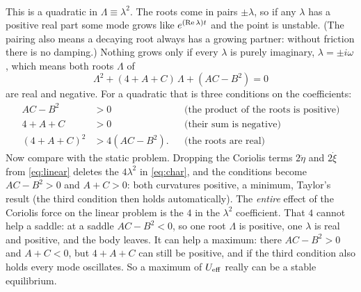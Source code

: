 \documentclass[12pt]{article}
\numberwithin{equation}{section}
\newcommand{\Ueff}{U_{\rm eff}}
\begin{document}
\begin{tcolorbox}[enhanced,breakable,colback=gray!8,colframe=gray!45,boxrule=0.5pt,
    left=5pt,right=5pt,top=5pt,bottom=5pt]
\begin{align}
  \label{eq:char}
\end{align}
This is a quadratic in $\Lambda \equiv \lambda^2$. The roots come in pairs $\pm\lambda$, so if
any $\lambda$ has a positive real part some mode grows like $e^{({\rm Re}\,\lambda) t}$ and the
point is unstable. (The pairing also means a decaying root always has a growing partner: without
friction there is no damping.) Nothing grows only if every $\lambda$ is purely imaginary, $\lambda =
\pm i\omega$, which means both roots $\Lambda$ of
\begin{equation}
  \label{eq:charL}
  \Lambda^2 + (4 + A + C)\,\Lambda + (AC - B^2) = 0
\end{equation}
are real and negative. For a quadratic that is three conditions on the coefficients:
\begin{align}
  AC - B^2 &> 0 && \text{(the product of the roots is positive)} \nonumber\\
  4 + A + C &> 0 && \text{(their sum is negative)} \nonumber\\
  (4 + A + C)^2 &> 4(AC - B^2) . && \text{(the roots are real)}
  \label{eq:conditions}
\end{align}
Now compare with the static problem. Dropping the Coriolis terms $2\dot\eta$ and $2\dot\xi$
from \eqref{eq:linear} deletes the $4\lambda^2$ in \eqref{eq:char}, and the conditions become
$AC - B^2 > 0$ and $A + C > 0$: both curvatures positive, a minimum, Taylor's result (the third
condition then holds automatically). The \emph{entire} effect of the Coriolis force on the
linear problem is the $4$ in the $\lambda^2$ coefficient. That $4$ cannot help a saddle: at a
saddle $AC - B^2 < 0$, so one root $\Lambda$ is positive, one $\lambda$ is real and positive,
and the body leaves. It can help a maximum: there $AC - B^2 > 0$ and $A + C < 0$, but $4 + A +
C$ can still be positive, and if the third condition also holds every mode
oscillates. So a maximum of $\Ueff$ really can be a stable equilibrium.

\medskip


\end{tcolorbox}
\end{document}
